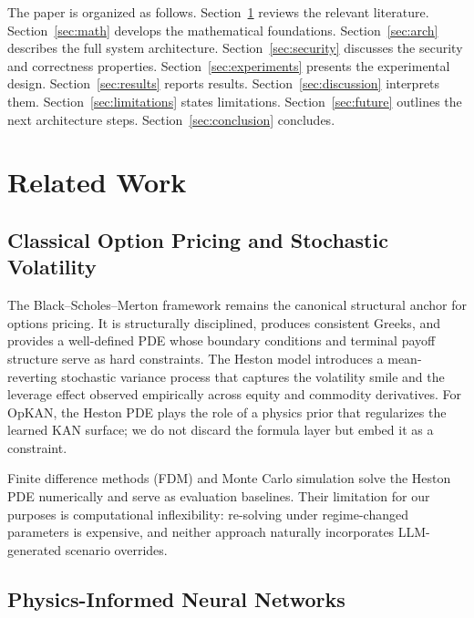 \documentclass[11pt,a4paper]{article}
\begin{document}
The paper is organized as follows. Section~\ref{sec:related} reviews the relevant literature. Section~\ref{sec:math} develops the mathematical foundations. Section~\ref{sec:arch} describes the full system architecture. Section~\ref{sec:security} discusses the security and correctness properties. Section~\ref{sec:experiments} presents the experimental design. Section~\ref{sec:results} reports results. Section~\ref{sec:discussion} interprets them. Section~\ref{sec:limitations} states limitations. Section~\ref{sec:future} outlines the next architecture steps. Section~\ref{sec:conclusion} concludes.

\section{Related Work}
\label{sec:related}

\subsection{Classical Option Pricing and Stochastic Volatility}

The Black--Scholes--Merton framework \citep{black_scholes_1973,merton_1973} remains the canonical structural anchor for options pricing. It is structurally disciplined, produces consistent Greeks, and provides a well-defined PDE whose boundary conditions and terminal payoff structure serve as hard constraints. The Heston model \citep{heston1993closed} introduces a mean-reverting stochastic variance process that captures the volatility smile and the leverage effect observed empirically across equity and commodity derivatives. For OpKAN, the Heston PDE plays the role of a physics prior that regularizes the learned KAN surface; we do not discard the formula layer but embed it as a constraint.

Finite difference methods (FDM) \citep{wilmott1993option} and Monte Carlo simulation solve the Heston PDE numerically and serve as evaluation baselines. Their limitation for our purposes is computational inflexibility: re-solving under regime-changed parameters is expensive, and neither approach naturally incorporates LLM-generated scenario overrides.

\subsection{Physics-Informed Neural Networks}
\end{document}
